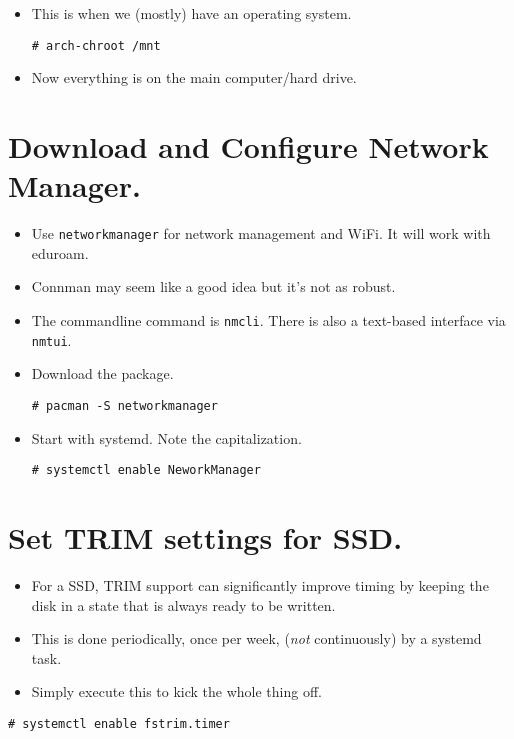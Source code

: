 \documentclass{article}
\begin{document}
\begin{itemize}
  \item This is when we (mostly) have an operating system.
\begin{verbatim}
# arch-chroot /mnt
\end{verbatim}
  \item Now everything is on the main computer/hard drive.
\end{itemize}

\section{Download and Configure Network Manager.}

\begin{itemize}
  \item Use \verb|networkmanager| for network management and WiFi.
    It will work with eduroam.
  \item Connman may seem like a good idea but it's not as robust.
  \item The commandline command is \verb|nmcli|.
    There is also a text-based interface via \verb|nmtui|.
  \item Download the package.  
\begin{verbatim}
# pacman -S networkmanager
\end{verbatim}
  \item Start with systemd. Note the capitalization.
\begin{verbatim}
# systemctl enable NeworkManager
\end{verbatim}
\end{itemize}

\section{Set TRIM settings for SSD.}

\begin{itemize}
  \item For a SSD, TRIM support can significantly improve timing by keeping the disk in a state that is always ready to be written.
  \item This is done periodically, once per week, (\emph{not} continuously) by a systemd task.
  \item Simply execute this to kick the whole thing off.
\end{itemize}
\begin{verbatim}
# systemctl enable fstrim.timer
\end{verbatim}
\end{document}
